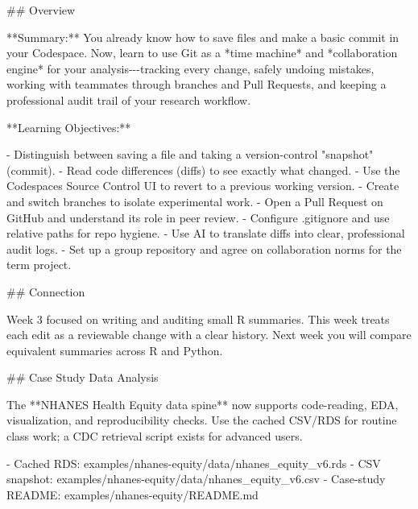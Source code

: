 \documentclass[
  letterpaper,
  DIV=11,
  numbers=noendperiod,
  oneside]{scrreprt}
\newenvironment{Shaded}{\begin{snugshade}}{\end{snugshade}}
\newcommand{\FunctionTok}[1]{\textcolor[rgb]{0.28,0.35,0.67}{#1}}
\newcommand{\InformationTok}[1]{\textcolor[rgb]{0.37,0.37,0.37}{#1}}
\newcommand{\NormalTok}[1]{\textcolor[rgb]{0.00,0.23,0.31}{#1}}
\newcommand{\SpecialStringTok}[1]{\textcolor[rgb]{0.13,0.47,0.30}{#1}}
\begin{document}
\begin{Shaded}
\begin{Highlighting}[numbers=left,,]
\FunctionTok{\#\# Overview}

\NormalTok{**Summary:** You already know how to save files and make a basic commit in your Codespace. Now, learn to use Git as a *time machine* and *collaboration engine* for your analysis{-}{-}{-}tracking every change, safely undoing mistakes, working with teammates through branches and Pull Requests, and keeping a professional audit trail of your research workflow.}

\NormalTok{**Learning Objectives:**}

\SpecialStringTok{{-}   }\NormalTok{Distinguish between saving a file and taking a version{-}control "snapshot" (commit).}
\SpecialStringTok{{-}   }\NormalTok{Read code differences (diffs) to see exactly what changed.}
\SpecialStringTok{{-}   }\NormalTok{Use the Codespaces Source Control UI to revert to a previous working version.}
\SpecialStringTok{{-}   }\NormalTok{Create and switch branches to isolate experimental work.}
\SpecialStringTok{{-}   }\NormalTok{Open a Pull Request on GitHub and understand its role in peer review.}
\SpecialStringTok{{-}   }\NormalTok{Configure }\InformationTok{\textasciigrave{}.gitignore\textasciigrave{}}\NormalTok{ and use relative paths for repo hygiene.}
\SpecialStringTok{{-}   }\NormalTok{Use AI to translate diffs into clear, professional audit logs.}
\SpecialStringTok{{-}   }\NormalTok{Set up a group repository and agree on collaboration norms for the term project.}

\FunctionTok{\#\# Connection}

\NormalTok{Week 3 focused on writing and auditing small R summaries. This week treats each edit as a reviewable change with a clear history. Next week you will compare equivalent summaries across R and Python.}

\FunctionTok{\#\# Case Study Data Analysis}

\NormalTok{The **NHANES Health Equity data spine** now supports code{-}reading, EDA, visualization, and reproducibility checks. Use the cached CSV/RDS for routine class work; a CDC retrieval script exists for advanced users.}

\SpecialStringTok{{-} }\NormalTok{Cached RDS: }\InformationTok{\textasciigrave{}examples/nhanes{-}equity/data/nhanes\_equity\_v6.rds\textasciigrave{}}
\SpecialStringTok{{-} }\NormalTok{CSV snapshot: }\InformationTok{\textasciigrave{}examples/nhanes{-}equity/data/nhanes\_equity\_v6.csv\textasciigrave{}}
\SpecialStringTok{{-} }\NormalTok{Case{-}study README: }\InformationTok{\textasciigrave{}examples/nhanes{-}equity/README.md\textasciigrave{}}


\end{Highlighting}
\end{Shaded}
\end{document}
